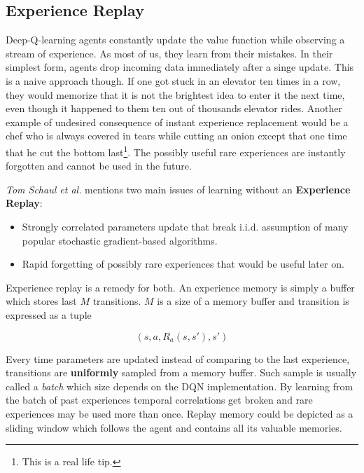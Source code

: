 \subsection{Experience Replay}
\label{sub:experience-replay}

Deep-Q-learning agents constantly update the value function while observing a stream of experience. As most of us, they learn from their mistakes. In their simplest form, agents drop incoming data immediately after a singe update. This is a naive approach though. If one got stuck in an elevator ten times in a row, they would memorize that it is not the brightest idea to enter it the next time, even though it happened to them ten out of thousands elevator rides. Another example of undesired consequence of instant experience replacement would be a chef who is always covered in tears while cutting an onion except that one time that he cut the bottom last\footnote{This is a real life tip.}. The possibly useful rare experiences are instantly forgotten and cannot be used in the future.

\emph{Tom Schaul et al.} \cite{schaul2015prioritized} mentions two main issues of learning without an \textbf{Experience Replay}:

\begin{itemize}
    \item Strongly correlated parameters update that break i.i.d. assumption of many popular stochastic gradient-based algorithms.
    \item Rapid forgetting of possibly rare experiences that would be useful later on.
\end{itemize}

Experience replay is a remedy for both. An experience memory is simply a buffer which stores last $M$ transitions. $M$ is a size of a memory buffer and transition is expressed as a tuple

\begin{equation}
    \left(s, a, R_a(s, s'), s'\right)
\end{equation}

Every time parameters are updated instead of comparing to the last experience, transitions are \textbf{uniformly} sampled from a memory buffer. Such sample is usually called a \emph{batch} which size depends on the DQN implementation. By learning from the batch of past experiences temporal correlations get broken and rare experiences may be used more than once. Replay memory could be depicted as a sliding window which follows the agent and contains all its valuable memories. 